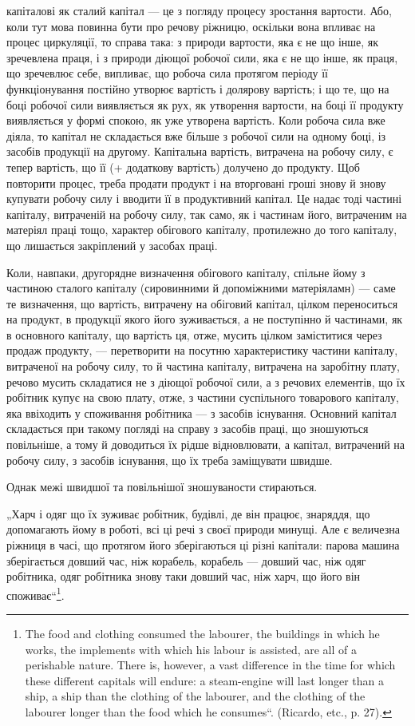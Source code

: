 \parcont{}  %
капіталові як сталий капітал — це з погляду процесу зростання вартости.
Або, коли тут мова повинна бути про речову ріжницю, оскільки вона
впливає на процес циркуляції, то справа така: з природи вартости, яка є
не що інше, як зречевлена праця, і з природи діющої робочої сили, яка
є не що інше, як праця, що зречевлює себе, випливає, що робоча сила
протягом періоду її функціонування постійно утворює вартість і долярову
вартість; і що те, що на боці робочої сили виявляється як рух, як
утворення вартости, на боці її продукту виявляється у формі спокою,
як уже утворена вартість. Коли робоча сила вже діяла, то капітал не
складається вже більше з робочої сили на одному боці, із засобів продукції
на другому. Капітальна вартість, витрачена на робочу силу, є тепер
вартість, що її (+ додаткову вартість) долучено до продукту. Щоб
повторити процес, треба продати продукт і на вторговані гроші знову й
знову купувати робочу силу і вводити її в продуктивний капітал. Це
надає тоді частині капіталу, витраченій на робочу силу, так само, як і частинам
його, витраченим на матеріял праці тощо, характер обігового капіталу,
протилежно до того капіталу, що лишається закріплений у засобах праці.

Коли, навпаки, другорядне визначення обігового капіталу, спільне
йому з частиною сталого капіталу (сировинними й допоміжними матеріяламн)
— саме те визначення, що вартість, витрачену на обіговий капітал,
цілком переноситься на продукт, в продукції якого його зуживається, а
не поступінно й частинами, як в основного капіталу, що вартість ця,
отже, мусить цілком заміститися через продаж продукту, — перетворити
на посутню характеристику частини капіталу, витраченої на робочу силу,
то й частина капіталу, витрачена на заробітну плату, речово мусить
складатися не з діющої робочої сили, а з речових елементів, що їх робітник
купує на свою плату, отже, з частини суспільного товарового капіталу,
яка ввіходить у споживання робітника — з засобів існування.
Основний капітал складається при такому погляді на справу з засобів
праці, що зношуються повільніше, а тому й доводиться їх рідше відновлювати,
а капітал, витрачений на робочу силу, з засобів існування, що
їх треба заміщувати швидше.

Однак межі швидшої та повільнішої зношуваности стираються.

„Харч і одяг що їх зуживає робітник, будівлі, де він працює, знаряддя,
що допомагають йому в роботі, всі ці речі з своєї природи минущі.
Але є величезна ріжниця в часі, що протягом його зберігаються
ці різні капітали: парова машина зберігається довший час, ніж корабель,
корабель — довший час, ніж одяг робітника, одяг робітника знову таки
довший час, ніж харч, що його він споживає“\footnote{
The food and clothing consumed the labourer, the buildings in which he
works, the implements with which his labour is assisted, are all of a perishable
nature. There is, however, a vast difference in the time for which these different
capitals will endure: a steam-engine will last longer than a ship, a ship than the
clothing of the labourer, and the clothing of the labourer longer than the food which
he consumes“. (Ricardo, etc., p. 27).
}.
